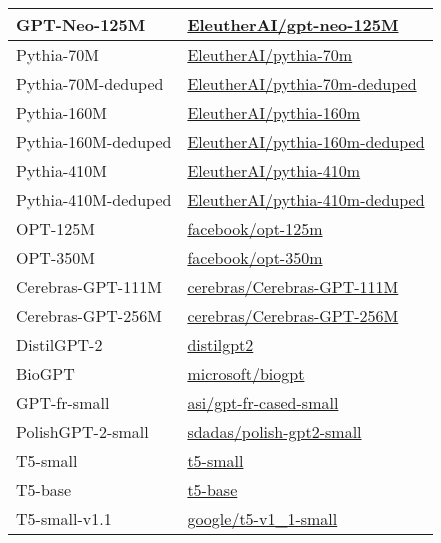 \begin{longtable}{| l | l |}
    \hline
    GPT-Neo-125M & \href{https://huggingface.co/EleutherAI/gpt-neo-125M}{EleutherAI/gpt-neo-125M} \\
    \hline
    Pythia-70M & \href{https://huggingface.co/EleutherAI/pythia-70m}{EleutherAI/pythia-70m} \\
    \hline
    Pythia-70M-deduped & \href{https://huggingface.co/EleutherAI/pythia-70m-deduped}{EleutherAI/pythia-70m-deduped} \\
    \hline
    Pythia-160M & \href{https://huggingface.co/EleutherAI/pythia-160m}{EleutherAI/pythia-160m} \\
    \hline
    Pythia-160M-deduped & \href{https://huggingface.co/EleutherAI/pythia-160m-deduped}{EleutherAI/pythia-160m-deduped} \\
    \hline
    Pythia-410M & \href{https://huggingface.co/EleutherAI/pythia-410m}{EleutherAI/pythia-410m} \\
    \hline
    Pythia-410M-deduped & \href{https://huggingface.co/EleutherAI/pythia-410m-deduped}{EleutherAI/pythia-410m-deduped} \\
    \hline
    OPT-125M & \href{https://huggingface.co/facebook/opt-125m}{facebook/opt-125m} \\
    \hline
    OPT-350M & \href{https://huggingface.co/facebook/opt-350m}{facebook/opt-350m} \\
    \hline
    Cerebras-GPT-111M & \href{https://huggingface.co/cerebras/Cerebras-GPT-111M}{cerebras/Cerebras-GPT-111M} \\
    \hline
    Cerebras-GPT-256M & \href{https://huggingface.co/cerebras/Cerebras-GPT-256M}{cerebras/Cerebras-GPT-256M} \\
    \hline
    DistilGPT-2 & \href{https://huggingface.co/distilgpt2}{distilgpt2} \\
    \hline
    BioGPT & \href{https://huggingface.co/microsoft/biogpt}{microsoft/biogpt} \\
    \hline
    GPT-fr-small & \href{https://huggingface.co/asi/gpt-fr-cased-small}{asi/gpt-fr-cased-small} \\
    \hline
    PolishGPT-2-small & \href{https://huggingface.co/sdadas/polish-gpt2-small}{sdadas/polish-gpt2-small} \\
    \hline
    T5-small & \href{https://huggingface.co/t5-small}{t5-small} \\
    \hline
    T5-base & \href{https://huggingface.co/t5-base}{t5-base} \\
    \hline
    T5-small-v1.1 & \href{https://huggingface.co/google/t5-v1_1-small}{google/t5-v1\_1-small} \\

\end{longtable}
